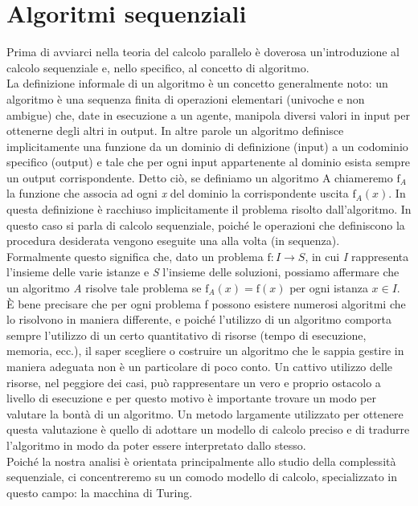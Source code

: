 \chapter{Algoritmi sequenziali}
Prima di avviarci nella teoria del calcolo parallelo è doverosa un'introduzione al calcolo sequenziale e, nello specifico, al concetto di algoritmo.\\
La definizione informale di un algoritmo è un concetto generalmente noto: un algoritmo è una sequenza finita di operazioni elementari (univoche e non ambigue) che, date in esecuzione a un agente, manipola diversi valori in input per ottenerne degli altri in output. In altre parole un algoritmo definisce implicitamente una funzione da un dominio di definizione (input) a un codominio specifico (output) e tale che per ogni input appartenente al dominio esista sempre un output corrispondente. Detto ciò, se definiamo un algoritmo A chiameremo $\mathrm{f}_{A}$ la funzione che associa ad ogni \textit{x} del dominio la corrispondente uscita $\mathrm{f}_{A}(x)$. In questa definizione è racchiuso implicitamente il problema risolto dall'algoritmo. In questo caso si parla di calcolo sequenziale, poiché le operazioni che definiscono la procedura desiderata vengono eseguite una alla volta (in sequenza).\\
Formalmente questo significa che, dato un problema $\mathrm{f}: I \rightarrow S$, in cui \textit{I} rappresenta l'insieme delle varie istanze e \textit{S} l'insieme delle soluzioni, possiamo affermare che un algoritmo \textit{A} risolve tale problema se $\mathrm{f}_{A}(x) = \mathrm{f}(x)$ per ogni istanza $x \in I$.\\
È bene precisare che per ogni problema f possono esistere numerosi algoritmi che lo risolvono in maniera differente, e poiché l'utilizzo di un algoritmo comporta sempre l'utilizzo di un certo quantitativo di risorse (tempo di esecuzione, memoria, ecc.), il saper scegliere o costruire un algoritmo che le sappia gestire in maniera adeguata non è un particolare di poco conto. Un cattivo utilizzo delle risorse, nel peggiore dei casi, può rappresentare un vero e proprio ostacolo a livello di esecuzione e per questo motivo è importante trovare un modo per valutare la bontà di un algoritmo. Un metodo largamente utilizzato per ottenere questa valutazione è quello di adottare un modello di calcolo preciso e di tradurre l'algoritmo in modo da poter essere interpretato dallo stesso.\\
Poiché la nostra analisi è orientata principalmente allo studio della complessità sequenziale, ci concentreremo su un comodo modello di calcolo, specializzato in questo campo: la macchina di Turing.
